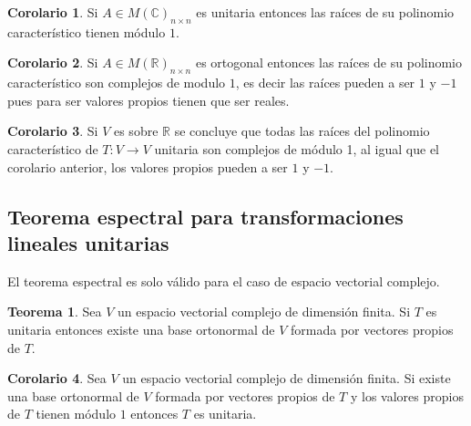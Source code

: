 \documentclass[10pt]{article}
\theoremstyle{definition}
\newtheorem{theorem}{Teorema}[section]
\newtheorem{corollary}{Corolario}[theorem]
\begin{document}
\begin{corollary}
    Si $A\in M(\mathbb{C})_{n\times n}$ es unitaria entonces las raíces de su polinomio característico tienen módulo $1$.
\end{corollary}
\begin{corollary}
    Si $A\in M(\mathbb{R})_{n\times n}$ es ortogonal entonces las raíces de su polinomio característico son complejos de modulo $1$, es decir las raíces pueden a ser $1$ y $-1$ pues para ser valores propios tienen que ser reales.
\end{corollary}
\begin{corollary}
    Si $V$ es sobre $\mathbb{R}$ se concluye que todas las raíces del polinomio característico de $T:V\to V$ unitaria son complejos de módulo 1, al igual que el corolario anterior, los valores propios pueden a ser $1$ y $-1$.
\end{corollary}
\subsection{Teorema espectral para transformaciones lineales unitarias}
El teorema espectral es solo válido para el caso de espacio vectorial complejo.
\begin{theorem}
    Sea $V$ un espacio vectorial complejo de dimensión finita. Si $T$ es unitaria entonces existe una base ortonormal de $V$ formada por vectores propios de $T$.
\end{theorem}
\begin{corollary}
    Sea $V$ un espacio vectorial complejo de dimensión finita. Si existe una base ortonormal de $V$ formada por vectores propios de $T$ y los valores propios de $T$ tienen módulo $1$ entonces $T$ es unitaria.
\end{corollary}\newpage
\end{document}
